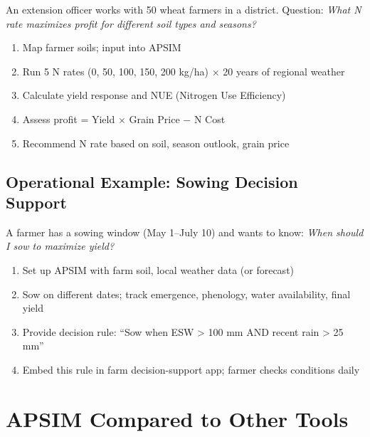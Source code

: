 An extension officer works with 50 wheat farmers in a district. Question: \textit{What N rate maximizes profit for different soil types and seasons?}

\begin{enumerate}
  \item Map farmer soils; input into APSIM
  \item Run 5 N rates (0, 50, 100, 150, 200 kg/ha) × 20 years of regional weather
  \item Calculate yield response and NUE (Nitrogen Use Efficiency)
  \item Assess profit = Yield $\times$ Grain Price $-$ N Cost
  \item Recommend N rate based on soil, season outlook, grain price
\end{enumerate}

\subsection{Operational Example: Sowing Decision Support}

A farmer has a sowing window (May 1–July 10) and wants to know: \textit{When should I sow to maximize yield?}

\begin{enumerate}
  \item Set up APSIM with farm soil, local weather data (or forecast)
  \item Sow on different dates; track emergence, phenology, water availability, final yield
  \item Provide decision rule: ``Sow when ESW > 100 mm AND recent rain > 25 mm''
  \item Embed this rule in farm decision-support app; farmer checks conditions daily
\end{enumerate}

\section{APSIM Compared to Other Tools}

